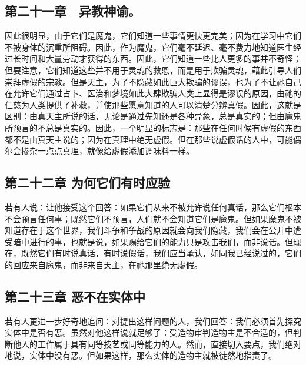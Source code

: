 
\subsection{第二十一章　异教神谕。}

因此很明显，由于它们是魔鬼，它们知道一些事情更快更完美；因为在学习中它们不被身体的沉重所阻碍。因此，作为魔鬼，它们毫不延迟、毫不费力地知道医生经过长时间和大量劳动才获得的东西。因此，它们知道一些比人更多的事并不奇怪；但要注意，它们知道这些并不用于灵魂的救恩，而是用于欺骗灵魂，藉此引导人们崇拜虚假的宗教。但是天主，为了不隐藏如此巨大欺骗的谬误，也为了不让祂自己在允许它们通过占卜、医治和梦境如此大肆欺骗人类上显得是谬误的原因，由祂的仁慈为人类提供了补救，并使那些愿意知道的人可以清楚分辨真假。因此，这就是区别：由真天主所说的话，无论是通过先知还是各种异象，总是真实的；但由魔鬼所预言的不总是真实的。因此，一个明显的标志是：那些在任何时候有虚假的东西都不是由真天主说的；因为在真理中绝无虚假。但在那些说虚假话的人中，可能偶尔会掺杂一点点真理，就像给虚假添加调味料一样。\par


\subsection{第二十二章 为何它们有时应验}

若有人说：让他接受这个回答：如果它们从来不被允许说任何真话，那么它们根本不会预言任何事；既然它们不预言，人们就不会知道它们是魔鬼。但如果魔鬼不被知道存在于这个世界，我们斗争和争战的原因就会向我们隐藏，我们会在公开中遭受暗中进行的事，也就是说，如果赐给它们的能力只是攻击我们，而非说话。但现在，既然它们有时说真话，有时说假话，我们应当承认，如同我已经说过的，它们的回应来自魔鬼，而非来自天主，在祂那里绝无虚假。\par


\subsection{第二十三章 恶不在实体中}

若有人更进一步好奇地追问：对提出这样问题的人，我们回答：我们必须首先探究实体中是否有恶。虽然对他这样说就足够了：受造物审判造物主是不合适的，但判断他人的工作属于具有同等技艺或同等能力的人。然而，直接切入要点，我们绝对地说，实体中没有恶。但如果这样，那么实体的造物主就被徒然地指责了。\par

